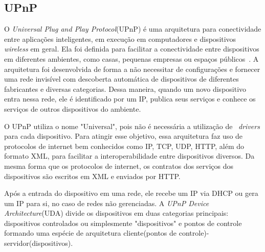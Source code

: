 \subsection{UPnP}
O \emph{Universal Plug and Play Protocol}(UPnP) é uma arquitetura para conectividade entre aplicações inteligentes, em execução em computadores e dispositivos \emph{wireless} em geral. Ela foi definida para facilitar a conectividade entre dispositivos em diferentes ambientes, como casas, pequenas empresas ou espaços públicos~\cite{upnpArch}. A arquitetura foi desenvolvida de forma a não necessitar de configurações e fornecer uma rede invisível com descoberta automática de dispositivos de diferentes fabricantes e diversas categorias. Dessa maneira, quando um novo dispositivo entra nessa rede, ele é identificado por um IP, publica seus serviços e conhece os serviços de outros dispositivos do ambiente. 

O UPnP utiliza o nome "Universal", pois não é necessária a utilização de ~\emph{drivers} para cada dispositivo. Para atingir esse objetivo, essa arquitetura faz uso de protocolos de internet bem conhecidos como IP, TCP, UDP, HTTP, além do formato XML, para facilitar a interoperabilidade entre dispositivos diversos. Da mesma forma que os protocolos de internet, os contratos dos serviços dos dispositivos são escritos em XML e enviados por HTTP.

Após a entrada do dispositivo em uma rede, ele recebe um IP via DHCP ou gera um IP para si, no caso de redes não gerenciadas. A \emph{UPnP Device Architecture}(UDA) divide os dispositivos em duas categorias principais: dispositivos controlados ou simplesmente "dispositivos" e pontos de controle~\cite{upnpArch} formando uma espécie de arquitetura cliente(pontos de controle)-servidor(dispositivos). 

\begin{comment}	
Quando um dispositivo entra na rede UPnP, ele comunica seus serviços para os pontos de controle ou, caso seja um ponto de controle, o protocolo de descoberta do UPnP permite que ele procure dispositivos de seu interesse. O segundo passo é o envio da descrição detalhada do dispositivo para os pontos de controle, que de posse dessa descrição podem enviar mensagens de controle para o dispositivo(passo 3). Os pontos de controle podem também assinar um contrato para envio de notificações de evento utilizando algum dos serviços que o dispositivo provê(passo 4). O último passo é de apresentação. Caso o dispositivo possua uma URL de apresentação é possível abrir uma página \emph{web} no \emph{browser} e um usuário pode controlar o dispositivo por meio dessa página~\cite{upnpArch}.
\end{comment}


